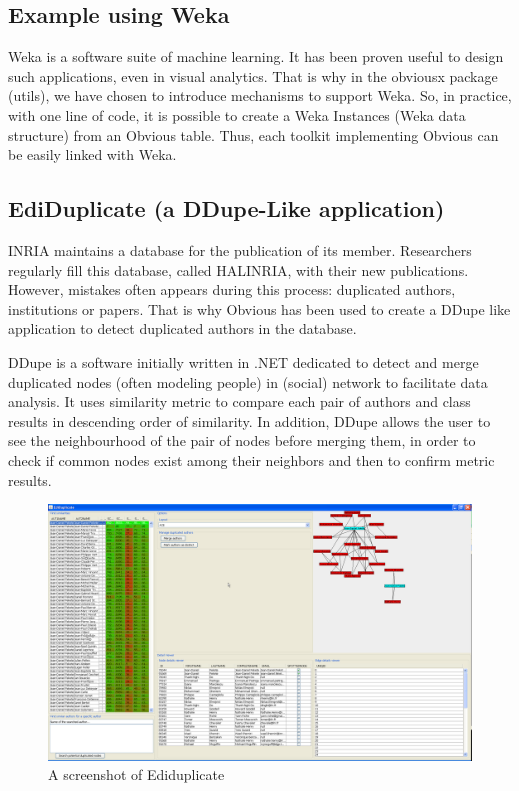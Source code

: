 \subsection{Example using Weka}

Weka is a software suite of machine learning. It has been proven useful to design such applications, even in visual analytics. That is why in the obviousx package (utils), we have chosen to introduce mechanisms to support Weka. So, in practice, with one line of code, it is possible to create a Weka Instances (Weka data structure) from an Obvious table. Thus, each toolkit implementing Obvious can be easily linked with Weka.

\subsection{EdiDuplicate (a DDupe-Like application)}

INRIA maintains a database for the publication of its member. Researchers regularly fill this database, called HALINRIA, with their new publications. However, mistakes often appears during this process: duplicated authors, institutions or papers. That is why Obvious has been used
to create a DDupe like application to detect duplicated authors in the database.

DDupe is a software initially written in .NET dedicated to detect and merge duplicated nodes (often modeling people)  in (social) network to facilitate data analysis. It uses similarity metric to compare each pair  of authors and class results in descending order of similarity. In addition, DDupe allows the user to see the neighbourhood of the pair of nodes before merging them, in order to check if common nodes exist among their neighbors and then to confirm metric results.

\begin{figure}
\includegraphics[width=\columnwidth]{figures/ediduplicate}
\caption{A screenshot of Ediduplicate}
\label{fig:ediduplicate}
\end{figure}

